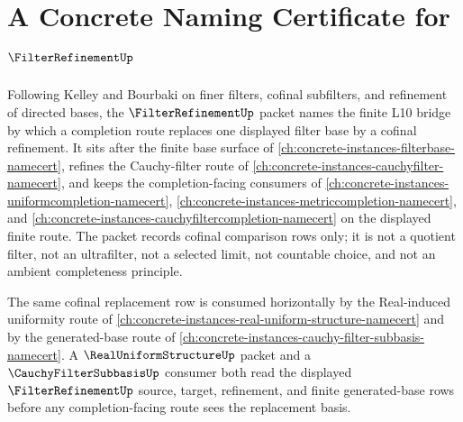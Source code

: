 \chapter{A Concrete Naming Certificate for $\FilterRefinementUp$}
\label{ch:concrete-instances-filter-refinement-namecert}

Following Kelley and Bourbaki on finer filters, cofinal subfilters, and refinement of directed bases, the $\FilterRefinementUp$ packet names the finite L10 bridge by which a completion route replaces one displayed filter base by a cofinal refinement. It sits after the finite base surface of \autoref{ch:concrete-instances-filterbase-namecert}, refines the Cauchy-filter route of \autoref{ch:concrete-instances-cauchyfilter-namecert}, and keeps the completion-facing consumers of \autoref{ch:concrete-instances-uniformcompletion-namecert}, \autoref{ch:concrete-instances-metriccompletion-namecert}, and \autoref{ch:concrete-instances-cauchyfiltercompletion-namecert} on the displayed finite route. The packet records cofinal comparison rows only; it is not a quotient filter, not an ultrafilter, not a selected limit, not countable choice, and not an ambient completeness principle.

The same cofinal replacement row is consumed horizontally by the Real-induced uniformity route of \autoref{ch:concrete-instances-real-uniform-structure-namecert} and by the generated-base route of \autoref{ch:concrete-instances-cauchy-filter-subbasis-namecert}. A $\RealUniformStructureUp$ packet and a $\CauchyFilterSubbasisUp$ consumer both read the displayed $\FilterRefinementUp$ source, target, refinement, and finite generated-base rows before any completion-facing route sees the replacement basis.

